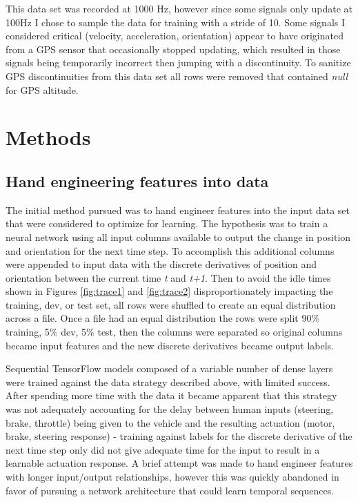 \documentclass{article}
\begin{document}
This data set was recorded at 1000 Hz, however since some signals only update at 100Hz I chose to sample the data for training with a stride of 10. Some signals I considered critical (velocity, acceleration, orientation) appear to have originated from a GPS sensor that occasionally stopped updating, which resulted in those signals being temporarily incorrect then jumping with a discontinuity. To sanitize GPS discontinuities from this data set all rows were removed that contained \textit{null} for GPS altitude.


\section{ Methods }

\subsection{Hand engineering features into data}

The initial method pursued was to hand engineer features into the input data set that were considered to optimize for learning. The hypothesis was to train a neural network using all input columns available to output the change in position and orientation for the next time step. To accomplish this additional columns were appended to input data with the discrete derivatives of position and orientation between the current time \textit{t} and \textit{t+1}. Then to avoid the idle times shown in Figures \ref{fig:trace1} and \ref{fig:trace2} disproportionately impacting the training, dev, or test set, all rows were shuffled to create an equal distribution across a file. Once a file had an equal distribution the rows were split 90\% training, 5\% dev, 5\% test, then the columns were separated so original columns became input features and the new discrete derivatives became output labels.

Sequential TensorFlow models composed of a variable number of dense layers were trained against the data strategy described above, with limited success. After spending more time with the data it became apparent that this strategy was not adequately accounting for the delay between human inputs (steering, brake, throttle) being given to the vehicle and the resulting actuation (motor, brake, steering response) - training against labels for the discrete derivative of the next time step only did not give adequate time for the input to result in a learnable actuation response. A brief attempt was made to hand engineer features with longer input/output relationships, however this was quickly abandoned in favor of pursuing a network architecture that could learn temporal sequences.
\end{document}
